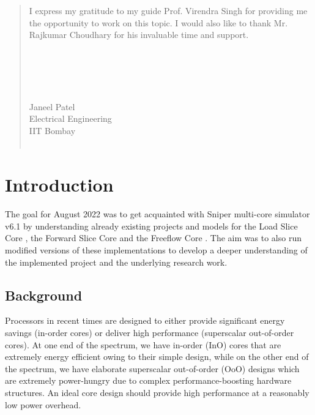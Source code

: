 \documentclass[a4paper,12pt, final]{report}
\begin{document}
\renewcommand{\abstractname}{Acknowledgement}
\begin{abstract}
I express my gratitude to my guide Prof. Virendra Singh for providing me the opportunity to work on this topic. I would also like to thank Mr. Rajkumar Choudhary for his invaluable time and support.
\\\\
\\\\
\\\\
Janeel Patel\\
Electrical Engineering\\
IIT Bombay\\\

\end{abstract}


\clearpage 
\renewcommand{\abstractname}{Abstract} 

\tableofcontents
  \listoffigures


\chapter{Introduction}

The goal for August 2022 was to get acquainted with Sniper multi-core simulator v6.1 \cite{sniper} by understanding already existing projects and models for the Load Slice Core \cite{loadslice}, the Forward Slice Core \cite{forwardslice} and the Freeflow Core \cite{freeflow}. The aim was to also run modified versions of these implementations to develop a deeper understanding of the implemented project and the underlying research work.

\section{Background}

Processors in recent times are designed to either provide significant energy savings (in-order cores) or deliver high performance (superscalar out-of-order cores). At one end of the spectrum, we have in-order (InO) cores that are extremely energy efficient owing to their simple design, while on the other end of the spectrum, we have elaborate superscalar out-of-order (OoO) designs which are extremely power-hungry due to complex performance-boosting hardware structures. An ideal core design should provide high performance at a reasonably low power overhead.
\end{document}
